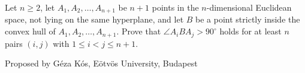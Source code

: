 Let $n\ge2$, let $A_1,A_2,\ldots,A_{n+1}$ be $n+1$ points in the $n$-dimensional Euclidean space, not lying on the same hyperplane, and let $B$ be a point strictly inside the convex hull of $A_1,A_2,\ldots,A_{n+1}$. Prove that $\angle A_iBA_j > 90^\circ$ holds for at least $n$ pairs $(i,j)$ with $\displaystyle{1\le i < j\le n+1}$.

Proposed by Géza Kós, Eötvös University, Budapest
